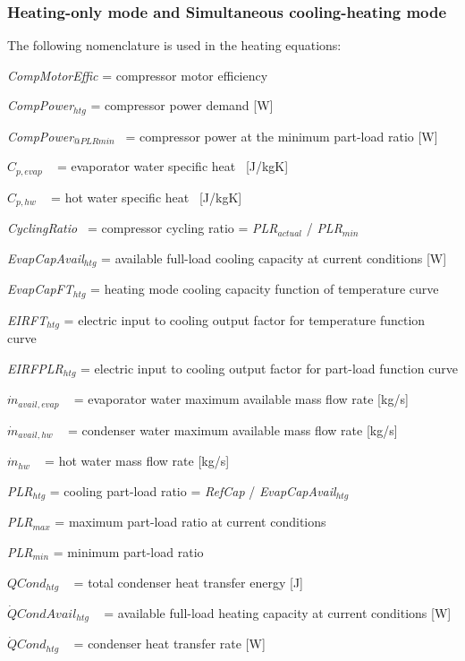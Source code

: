 \subsubsection{Heating-only mode and Simultaneous cooling-heating mode}\label{heating-only-mode-and-simultaneous-cooling-heating-mode}

The following nomenclature is used in the heating equations:

\emph{CompMotorEffic} = compressor motor efficiency

\emph{CompPower\(_{htg}\)} = compressor power demand {[}W{]}

\emph{CompPower\(_{@PLRmin}\)}~ = compressor power at the minimum part-load ratio {[}W{]}

\({C_{p,evap}}\) ~ = evaporator water specific heat~ {[}J/kgK{]}

\({C_{p,hw}}\) ~ = hot water specific heat~ {[}J/kgK{]}

\emph{CyclingRatio}~ = compressor cycling ratio = \emph{PLR\(_{actual}\)} / \emph{PLR\(_{min}\)}

\emph{EvapCapAvail\(_{htg}\)} = available full-load cooling capacity at current conditions {[}W{]}

\emph{EvapCapFT\(_{htg}\)} = heating mode cooling capacity function of temperature curve

\emph{EIRFT\(_{htg}\)} = electric input to cooling output factor for temperature function curve

\emph{EIRFPLR\(_{htg}\)} = electric input to cooling output factor for part-load function curve

\({\dot m_{avail,evap}}\) ~ = evaporator water maximum available mass flow rate {[}kg/s{]}

\({\dot m_{avail,hw}}\) ~ = condenser water maximum available mass flow rate {[}kg/s{]}

\({\dot m_{hw}}\) ~ = hot water mass flow rate {[}kg/s{]}

\emph{PLR\(_{htg}\)} = cooling part-load ratio = \emph{RefCap} / \emph{EvapCapAvail\(_{htg}\)}

\emph{PLR\(_{max}\)} = maximum part-load ratio at current conditions

\emph{PLR\(_{min}\)} = minimum part-load ratio

\(QCon{d_{htg}}\) ~ = total condenser heat transfer energy {[}J{]}

\(\dot QCondAvai{l_{htg}}\) ~ = available full-load heating capacity at current conditions {[}W{]}

\(\dot QCon{d_{htg}}\) ~ = condenser heat transfer rate {[}W{]}

